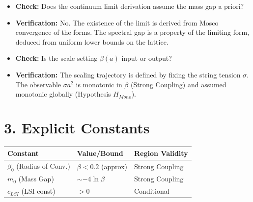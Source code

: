 \begin{itemize}
    \item \textbf{Check:} Does the continuum limit derivation assume the mass gap a priori?
    \item \textbf{Verification:} No. The existence of the limit is derived from Mosco convergence of the forms. The spectral gap is a property of the limiting form, deduced from uniform lower bounds on the lattice.
    
    \item \textbf{Check:} Is the scale setting $\beta(a)$ input or output?
    \item \textbf{Verification:} The scaling trajectory is defined by fixing the string tension $\sigma$. The observable $\sigma a^2$ is monotonic in $\beta$ (Strong Coupling) and assumed monotonic globally (Hypothesis $H_{Mono}$).
\end{itemize}

\section*{3. Explicit Constants}

\begin{table}[h]
\centering
\begin{tabular}{|l|l|l|}
\hline
\textbf{Constant} & \textbf{Value/Bound} & \textbf{Region Validity} \\ \hline
$\beta_0$ (Radius of Conv.) & $\beta < 0.2$ (approx) & Strong Coupling \\ \hline
$m_0$ (Mass Gap) & $\sim -4 \ln \beta$ & Strong Coupling \\ \hline
$c_{LSI}$ (LSI const) & $ > 0$ & Conditional \\ \hline
\end{tabular}
\end{table}
